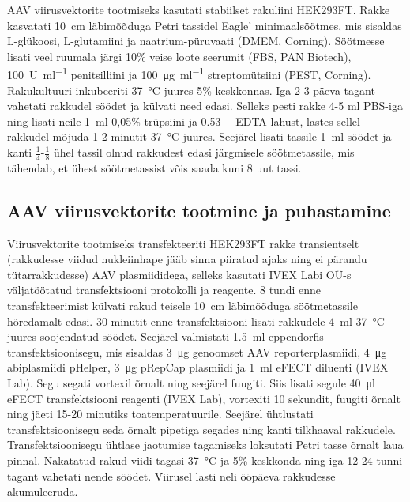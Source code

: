 \documentclass{trkut}%
\begin{document}
AAV viirusvektorite tootmiseks kasutati stabiilset rakuliini HEK293FT. Rakke kasvatati \SI{10}{\centi\metre} läbimõõduga Petri tassidel Eagle’ minimaalsöötmes, mis sisaldas L-glükoosi, L-glutamiini ja naatrium-püruvaati (DMEM, Corning). Söötmesse lisati veel ruumala järgi 10\% veise loote seerumit (FBS, PAN Biotech), \SI{100}{U\per\milli\litre} penitsilliini ja \SI{100}{\micro\gram\per\milli\litre} streptomütsiini (PEST, Corning). Rakukultuuri inkubeeriti \SI{37}{\celsius} juures 5\%  keskkonnas. Iga 2-3 päeva tagant vahetati rakkudel söödet ja külvati need edasi. Selleks pesti rakke 4-5 \si{\milli\litre} PBS-iga ning lisati neile \SI{1}{\milli\litre} 0,05\% trüpsiini ja \SI{0,53}{\milli\molar} EDTA lahust, lastes sellel rakkudel mõjuda 1-2 minutit \SI{37}{\celsius} juures. Seejärel lisati tassile \SI{1}{\milli\litre} söödet ja kanti $\frac{1}{4}$-$\frac{1}{8}$ ühel tassil olnud rakkudest edasi järgmisele söötmetassile, mis tähendab, et ühest söötmetassist võis saada kuni 8 uut tassi. 

\subsection{AAV viirusvektorite tootmine ja puhastamine}

Viirusvektorite tootmiseks transfekteeriti HEK293FT rakke transientselt (rakkudesse viidud nukleiinhape jääb sinna piiratud ajaks ning ei pärandu tütarrakkudesse) AAV plasmiididega, selleks kasutati IVEX Labi OÜ-s väljatöötatud transfektsiooni protokolli ja reagente. 8 tundi enne transfekteerimist külvati rakud teisele \SI{10}{\centi\metre} läbimõõduga söötmetassile hõredamalt edasi. 30 minutit enne transfektsiooni lisati rakkudele \SI{4}{\milli\litre} \SI{37}{\celsius} juures soojendatud söödet. Seejärel valmistati \SI{1,5}{\milli\litre} eppendorfis transfektsioonisegu, mis sisaldas \SI{3}{\micro\gram} genoomset AAV reporterplasmiidi, \SI{4}{\micro\gram} abiplasmiidi pHelper, \SI{3}{\micro\gram} pRepCap plasmiidi ja \SI{1}{\milli\litre} eFECT diluenti (IVEX Lab). Segu segati vortexil õrnalt ning seejärel fuugiti. Siis lisati segule \SI{40}{\micro\litre} eFECT transfektsiooni reagenti (IVEX Lab), vortexiti 10 sekundit, fuugiti õrnalt ning jäeti 15-20 minutiks toatemperatuurile. Seejärel ühtlustati transfektsioonisegu seda õrnalt pipetiga segades ning kanti tilkhaaval rakkudele. Transfektsioonisegu ühtlase jaotumise tagamiseks loksutati Petri tasse õrnalt laua pinnal. Nakatatud rakud viidi tagasi \SI{37}{\celsius} ja 5\%  keskkonda ning iga 12-24 tunni tagant vahetati nende söödet. Viirusel lasti neli ööpäeva rakkudesse akumuleeruda.
\end{document}
